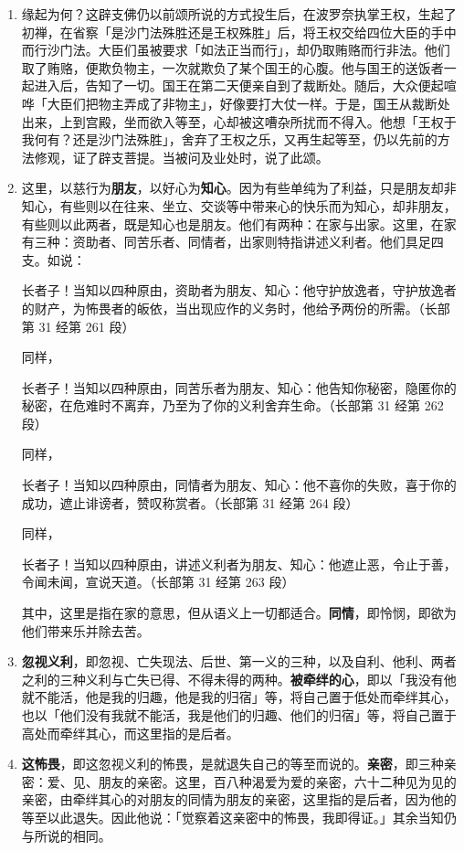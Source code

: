 \begin{enumerate}\item 缘起为何？这辟支佛仍以前颂所说的方式投生后，在波罗奈执掌王权，生起了初禅，在省察「是沙门法殊胜还是王权殊胜」后，将王权交给四位大臣的手中而行沙门法。大臣们虽被要求「如法正当而行」，却仍取贿赂而行非法。他们取了贿赂，便欺负物主，一次就欺负了某个国王的心腹。他与国王的送饭者一起进入后，告知了一切。国王在第二天便亲自到了裁断处。随后，大众便起喧哗「大臣们把物主弄成了非物主」，好像要打大仗一样。于是，国王从裁断处出来，上到宫殿，坐而欲入等至，心却被这嘈杂所扰而不得入。他想「王权于我何有？还是沙门法殊胜」，舍弃了王权之乐，又再生起等至，仍以先前的方法修观，证了辟支菩提。当被问及业处时，说了此颂。
\item 这里，以慈行为\textbf{朋友}，以好心为\textbf{知心}。因为有些单纯为了利益，只是朋友却非知心，有些则以在往来、坐立、交谈等中带来心的快乐而为知心，却非朋友，有些则以此两者，既是知心也是朋友。他们有两种：在家与出家。这里，在家有三种：资助者、同苦乐者、同情者，出家则特指讲述义利者。他们具足四支。如说：\begin{quoting}长者子！当知以四种原由，资助者为朋友、知心：他守护放逸者，守护放逸者的财产，为怖畏者的皈依，当出现应作的义务时，他给予两份的所需。（长部第 31 经第 261 段）\end{quoting}同样，\begin{quoting}长者子！当知以四种原由，同苦乐者为朋友、知心：他告知你秘密，隐匿你的秘密，在危难时不离弃，乃至为了你的义利舍弃生命。（长部第 31 经第 262 段）\end{quoting}同样，\begin{quoting}长者子！当知以四种原由，同情者为朋友、知心：他不喜你的失败，喜于你的成功，遮止诽谤者，赞叹称赏者。（长部第 31 经第 264 段）\end{quoting}同样，\begin{quoting}长者子！当知以四种原由，讲述义利者为朋友、知心：他遮止恶，令止于善，令闻未闻，宣说天道。（长部第 31 经第 263 段）\end{quoting}其中，这里是指在家的意思，但从语义上一切都适合。\textbf{同情}，即怜悯，即欲为他们带来乐并除去苦。
\item \textbf{忽视义利}，即忽视、亡失现法、后世、第一义的三种，以及自利、他利、两者之利的三种义利与亡失已得、不得未得的两种。\textbf{被牵绊的心}，即以「我没有他就不能活，他是我的归趣，他是我的归宿」等，将自己置于低处而牵绊其心，也以「他们没有我就不能活，我是他们的归趣、他们的归宿」等，将自己置于高处而牵绊其心，而这里指的是后者。
\item \textbf{这怖畏}，即这忽视义利的怖畏，是就退失自己的等至而说的。\textbf{亲密}，即三种亲密：爱、见、朋友的亲密。这里，百八种渴爱为爱的亲密，六十二种见为见的亲密，由牵绊其心的对朋友的同情为朋友的亲密，这里指的是后者，因为他的等至以此退失。因此他说：「觉察着这亲密中的怖畏，我即得证。」其余当知仍与所说的相同。\end{enumerate}

